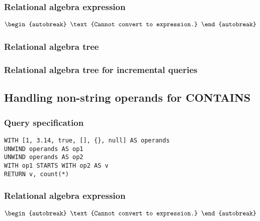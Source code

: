 \subsubsection*{Relational algebra expression}

\begin{align*}
\begin{autobreak}
\text{Cannot convert to expression.}
\end{autobreak}
\end{align*}

\subsubsection*{Relational algebra tree}


\subsubsection*{Relational algebra tree for incremental queries}


\subsection{Handling non-string operands for CONTAINS}

\subsubsection*{Query specification}

\begin{lstlisting}
WITH [1, 3.14, true, [], {}, null] AS operands
UNWIND operands AS op1
UNWIND operands AS op2
WITH op1 STARTS WITH op2 AS v
RETURN v, count(*)
\end{lstlisting}

\subsubsection*{Relational algebra expression}

\begin{align*}
\begin{autobreak}
\text{Cannot convert to expression.}
\end{autobreak}
\end{align*}

